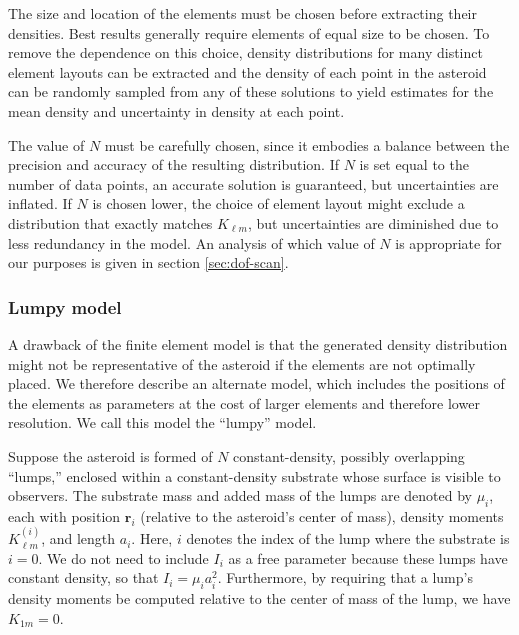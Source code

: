 \documentclass[fleqn,usenatbib]{mnras}
\begin{document}
The size and location of the elements must be chosen before extracting their densities. Best results generally require elements of equal size to be chosen. To remove the dependence on this choice, density distributions for many distinct element layouts can be extracted and the density of each point in the asteroid can be randomly sampled from any of these solutions to yield estimates for the mean density and uncertainty in density at each point.

The value of $N$ must be carefully chosen, since it embodies a balance between the precision and accuracy of the resulting distribution. If $N$ is set equal to the number of data points, an accurate solution is  guaranteed, but uncertainties are inflated. If $N$ is chosen lower, the choice of element layout might exclude a distribution that exactly matches $K_{\ell m}$, but uncertainties are diminished due to less redundancy in the model. An analysis of which value of $N$ is appropriate for our purposes is given in section \ref{sec:dof-scan}.

\subsubsection{Lumpy model}

A drawback of the finite element model is that the generated density distribution might not be representative of the asteroid if the elements are not optimally placed. We therefore describe an alternate model, which includes the positions of the elements as parameters at the cost of larger elements and therefore lower resolution. We call this model the ``lumpy'' model.

Suppose the asteroid is formed of $N$ constant-density, possibly overlapping ``lumps,'' enclosed within a constant-density substrate whose surface is visible to observers. The substrate mass and added mass of the lumps are denoted by $\mu_i$, each with position $\bm r_i$ (relative to the asteroid's center of mass), density moments $K_{\ell m}^{(i)}$, and length $a_i$. Here, $i$ denotes the index of the lump where the substrate is $i=0$.  We do not need to include $I_i$ as a free parameter because these lumps have constant density, so that $I_i = \mu_i a_i^2$. Furthermore, by requiring that a lump's density moments be computed relative to the center of mass of the lump, we have $K_{1m} = 0$.
\end{document}
